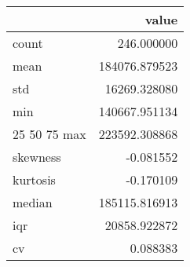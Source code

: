 \begin{tabular}{lr}
\toprule
 & value \\
\midrule
count & 246.000000 \\
mean & 184076.879523 \\
std & 16269.328080 \\
min & 140667.951134 \\
25%
50%
75%
max & 223592.308868 \\
skewness & -0.081552 \\
kurtosis & -0.170109 \\
median & 185115.816913 \\
iqr & 20858.922872 \\
cv & 0.088383 \\
\bottomrule
\end{tabular}
